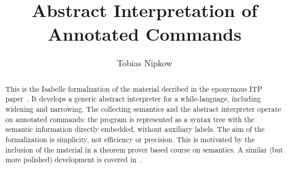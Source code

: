 \documentclass[11pt,a4paper]{article}
\begin{document}
\title{Abstract Interpretation of Annotated Commands}
\author{Tobias Nipkow}
\maketitle

\begin{abstract}
This is the Isabelle formalization of the material decribed in the
eponymous  ITP paper~\cite{Nipkow-ITP12}. It develops a generic abstract interpreter for a
while-language, including widening and narrowing. The collecting
semantics and the abstract interpreter operate on annotated commands:
the program is represented as a syntax tree with the semantic
information directly embedded, without auxiliary labels. The aim of
the formalization is simplicity, not efficiency or
precision. This is motivated by the inclusion of the material in a
theorem prover based course on semantics. A similar (but more
polished) development is covered in~\cite{Concrete}.
\end{abstract}





\end{document}
